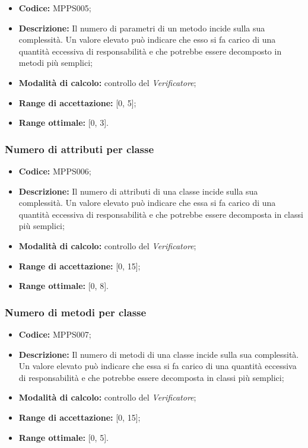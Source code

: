 \documentclass[../NormediProgetto.tex]{subfiles}
\begin{document}
\begin{itemize}
	\item \textbf{Codice:} MPPS005;
	
	\item \textbf{Descrizione:} Il numero di parametri di un metodo incide sulla sua complessità. Un valore elevato può indicare che esso si fa carico di una quantità eccessiva di responsabilità e che potrebbe essere decomposto in metodi più semplici;
	
	\item \textbf{Modalità di calcolo:} controllo del \textit{Verificatore};
	
	\item \textbf{Range di accettazione:} [0, 5];
	\item \textbf{Range ottimale:} [0, 3].
\end{itemize}

\subsubsection{Numero di attributi per classe}

\begin{itemize}
	\item \textbf{Codice:} MPPS006;
	
	\item \textbf{Descrizione:} Il numero di attributi di una classe incide sulla sua complessità. Un valore elevato può indicare che essa si fa carico di una quantità eccessiva di responsabilità e che potrebbe essere decomposta in classi più semplici;
	
	\item \textbf{Modalità di calcolo:} controllo del \textit{Verificatore};
	
	\item \textbf{Range di accettazione:} [0, 15];
	\item \textbf{Range ottimale:} [0, 8].
\end{itemize}

\subsubsection{Numero di metodi per classe}

\begin{itemize}
	\item \textbf{Codice:} MPPS007;
	
	\item \textbf{Descrizione:} Il numero di metodi di una classe incide sulla sua complessità. Un valore elevato può indicare che essa si fa carico di una quantità eccessiva di responsabilità e che potrebbe essere decomposta in classi più semplici;
	
	\item \textbf{Modalità di calcolo:} controllo del \textit{Verificatore};
	
	\item \textbf{Range di accettazione:} [0, 15];
	\item \textbf{Range ottimale:} [0, 5].
\end{itemize}
\end{document}

